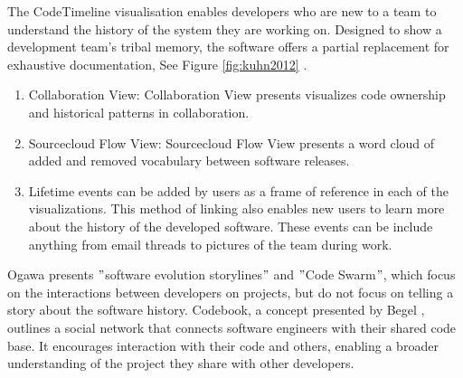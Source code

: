 \documentclass{egpubl}
\begin{document}
The CodeTimeline visualisation enables developers who are new to a team to understand the history of the system they are working on.  Designed to show a development team's tribal memory, the software offers a partial replacement for exhaustive documentation, See Figure \ref{fig:kuhn2012} \cite{kuhn2012}.
\begin{enumerate}
\item Collaboration View: Collaboration View presents visualizes code ownership and historical patterns in collaboration. 
\item Sourcecloud Flow View: Sourcecloud Flow View presents a word cloud of added and removed vocabulary between software releases. 
\item Lifetime events can be added by users as a frame of reference in each of the visualizations. This method of linking also enables new users to learn more about the history of the developed software. These events can be include anything from email threads to pictures of the team during work.
\end{enumerate}
Ogawa \cite{Ogawa,ogawa2009} presents $"$software evolution storylines$"$ and $"$Code Swarm$"$, which focus on the interactions between developers on projects, but do not focus on telling a story about the software history. Codebook, a concept presented by Begel \cite{begel2010}, outlines a social network that connects software engineers with their shared code base. It encourages interaction with their code and others, enabling a broader understanding of the project they share with other developers.
\end{document}
